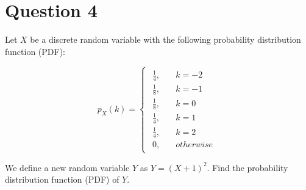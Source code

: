 \documentclass[12pt]{article}
\begin{document}
	
	\section*{Question 4}
	
	\noindent Let $X$ be a discrete random variable with the following probability distribution function (PDF):
	
	\[
		p_X(k) =
		\begin{cases}
			\begin{aligned}
				\frac{1}{4}, &\quad k = -2\\
				\frac{1}{8}, &\quad k = -1\\
				\frac{1}{8}, &\quad k = 0\\
				\frac{1}{4}, &\quad k = 1\\
				\frac{1}{4}, &\quad k = 2\\
				0, &\quad otherwise
			\end{aligned}
		\end{cases}
	\]
	
	\noindent We define a new random variable $Y$ as $Y = (X + 1)^2$. Find the probability distribution function (PDF) of $Y$.
	
	\bigskip
	
\end{document}
